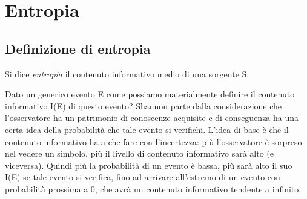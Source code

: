 \chapter{Entropia}

\section{Definizione di entropia}

\begin{definizione}[entropia]
Si dice \textit{entropia} il contenuto informativo medio di una sorgente S.
\end{definizione}

Dato un generico evento E come possiamo materialmente definire il contenuto informativo I(E) di questo evento? Shannon parte dalla considerazione che l'osservatore ha un patrimonio di conoscenze acquisite e di conseguenza ha una certa idea della probabilità che tale evento si verifichi. L'idea di base è che il contenuto informativo ha a che fare con l'incertezza: più l'osservatore è sorpreso nel 
vedere un simbolo, più il livello di contenuto informativo sarà alto (e viceversa).
Quindi più la probabilità di un evento è bassa, più sarà alto il suo I(E) se tale evento si verifica, fino ad arrivare all'estremo di un evento con probabilità prossima a 0, che avrà un contenuto informativo tendente a infinito.

